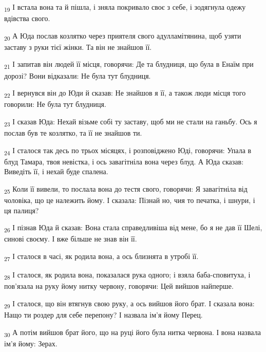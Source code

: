 \begin{tcolorbox}
\textsubscript{19} І встала вона та й пішла, і зняла покривало своє з себе, і зодягнула одежу вдівства свого.
\end{tcolorbox}
\begin{tcolorbox}
\textsubscript{20} А Юда послав козлятко через приятеля свого адулламітянина, щоб узяти заставу з руки тієї жінки. Та він не знайшов її.
\end{tcolorbox}
\begin{tcolorbox}
\textsubscript{21} І запитав він людей її місця, говорячи: Де та блудниця, що була в Енаїм при дорозі? Вони відказали: Не була тут блудниця.
\end{tcolorbox}
\begin{tcolorbox}
\textsubscript{22} І вернувся він до Юди й сказав: Не знайшов я її, а також люди місця того говорили: Не була тут блудниця.
\end{tcolorbox}
\begin{tcolorbox}
\textsubscript{23} І сказав Юда: Нехай візьме собі ту заставу, щоб ми не стали на ганьбу. Ось я послав був те козлятко, та її не знайшов ти.
\end{tcolorbox}
\begin{tcolorbox}
\textsubscript{24} І сталося так десь по трьох місяцях, і розповіджено Юді, говорячи: Упала в блуд Тамара, твоя невістка, і ось завагітніла вона через блуд. А Юда сказав: Виведіть її, і нехай буде спалена.
\end{tcolorbox}
\begin{tcolorbox}
\textsubscript{25} Коли її вивели, то послала вона до тестя свого, говорячи: Я завагітніла від чоловіка, що це належить йому. І сказала: Пізнай но, чия то печатка, і шнури, і ця палиця?
\end{tcolorbox}
\begin{tcolorbox}
\textsubscript{26} І пізнав Юда й сказав: Вона стала справедливіша від мене, бо я не дав її Шелі, синові своєму. І вже більше не знав він її.
\end{tcolorbox}
\begin{tcolorbox}
\textsubscript{27} І сталося в часі, як родила вона, а ось близнята в утробі її.
\end{tcolorbox}
\begin{tcolorbox}
\textsubscript{28} І сталося, як родила вона, показалася рука одного; і взяла баба-сповитуха, і пов'язала на руку йому нитку червону, говорячи: Цей вийшов найперше.
\end{tcolorbox}
\begin{tcolorbox}
\textsubscript{29} І сталося, що він втягнув свою руку, а ось вийшов його брат. І сказала вона: Нащо ти роздер для себе перепону? І назвала ім'я йому Перец.
\end{tcolorbox}
\begin{tcolorbox}
\textsubscript{30} А потім вийшов брат його, що на руці його була нитка червона. І вона назвала ім'я йому: Зерах.
\end{tcolorbox}

